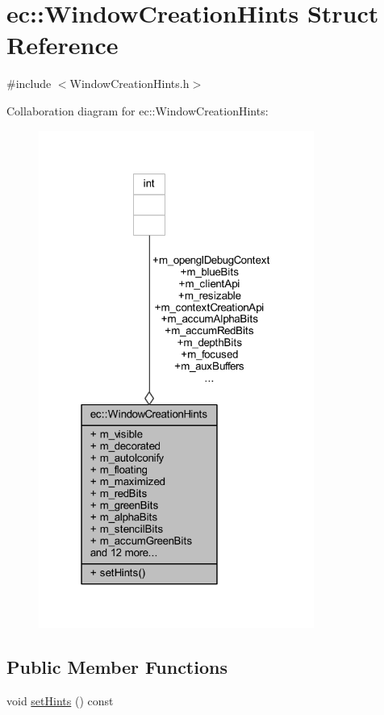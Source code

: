\hypertarget{structec_1_1_window_creation_hints}{}\section{ec\+:\+:Window\+Creation\+Hints Struct Reference}
\label{structec_1_1_window_creation_hints}


{\ttfamily \#include $<$Window\+Creation\+Hints.\+h$>$}



Collaboration diagram for ec\+:\+:Window\+Creation\+Hints\+:\nopagebreak
\begin{figure}[H]
\begin{center}
\leavevmode
\includegraphics[width=256pt]{structec_1_1_window_creation_hints__coll__graph}
\end{center}
\end{figure}
\subsection*{Public Member Functions}
\begin{DoxyCompactItemize}
\item 
void \mbox{\hyperlink{structec_1_1_window_creation_hints_ae62c9820ab420fb7ada244293c6ffa27}{set\+Hints}} () const
\end{DoxyCompactItemize}
